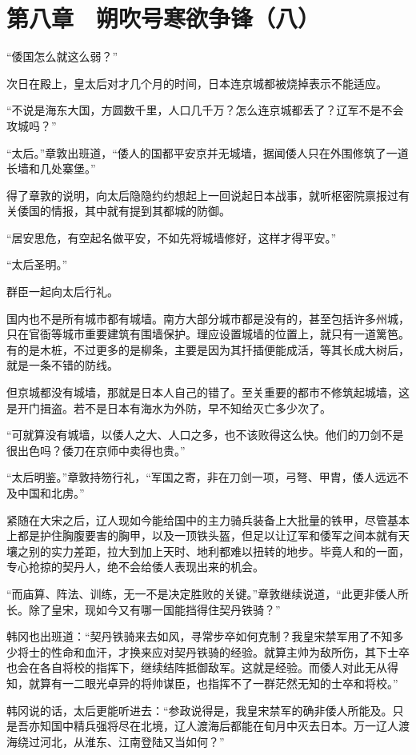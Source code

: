 \section{第八章　朔吹号寒欲争锋（八）}

“倭国怎么就这么弱？”

次日在殿上，皇太后对才几个月的时间，日本连京城都被烧掉表示不能适应。

“不说是海东大国，方圆数千里，人口几千万？怎么连京城都丢了？辽军不是不会攻城吗？”

“太后。”章敦出班道，“倭人的国都平安京并无城墙，据闻倭人只在外围修筑了一道长墙和几处寨堡。”

得了章敦的说明，向太后隐隐约约想起上一回说起日本战事，就听枢密院禀报过有关倭国的情报，其中就有提到其都城的防御。

“居安思危，有空起名做平安，不如先将城墙修好，这样才得平安。”

“太后圣明。”

群臣一起向太后行礼。

国内也不是所有城市都有城墙。南方大部分城市都是没有的，甚至包括许多州城，只在官衙等城市重要建筑有围墙保护。理应设置城墙的位置上，就只有一道篱笆。有的是木桩，不过更多的是柳条，主要是因为其扦插便能成活，等其长成大树后，就是一条不错的防线。

但京城都没有城墙，那就是日本人自己的错了。至关重要的都市不修筑起城墙，这是开门揖盗。若不是日本有海水为外防，早不知给灭亡多少次了。

“可就算没有城墙，以倭人之大、人口之多，也不该败得这么快。他们的刀剑不是很出色吗？倭刀在京师中卖得也贵。”

“太后明鉴。”章敦持笏行礼，“军国之寄，非在刀剑一项，弓弩、甲胄，倭人远远不及中国和北虏。”

紧随在大宋之后，辽人现如今能给国中的主力骑兵装备上大批量的铁甲，尽管基本上都是护住胸腹要害的胸甲，以及一顶铁头盔，但足以让辽军和倭军之间本就有天壤之别的实力差距，拉大到加上天时、地利都难以扭转的地步。毕竟人和的一面，专心抢掠的契丹人，绝不会给倭人表现出来的机会。

“而庙算、阵法、训练，无一不是决定胜败的关键。”章敦继续说道，“此更非倭人所长。除了皇宋，现如今又有哪一国能挡得住契丹铁骑？”

韩冈也出班道：“契丹铁骑来去如风，寻常步卒如何克制？我皇宋禁军用了不知多少将士的性命和血汗，才换来应对契丹铁骑的经验。就算主帅为敌所伤，其下士卒也会在各自将校的指挥下，继续结阵抵御敌军。这就是经验。而倭人对此无从得知，就算有一二眼光卓异的将帅谋臣，也指挥不了一群茫然无知的士卒和将校。”

韩冈说的话，太后更能听进去：“参政说得是，我皇宋禁军的确非倭人所能及。只是吾亦知国中精兵强将尽在北境，辽人渡海后都能在旬月中灭去日本。万一辽人渡海绕过河北，从淮东、江南登陆又当如何？”

